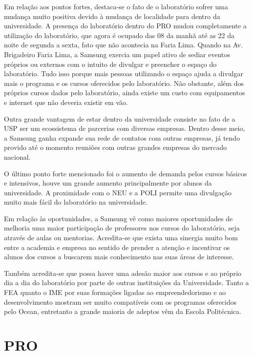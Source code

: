 Em relação aos pontos fortes, destaca-se o fato de o laboratório sofrer uma mudança muito positiva devido à mudança de localidade para dentro da universidade. A presença do laboratório dentro do PRO mudou completamente a utilização do laboratório, que agora é ocupado das 08 da manhã até as 22 da noite de segunda a sexta, fato que não acontecia na Faria Lima. Quando na Av. Brigadeiro Faria Lima, a Samsung exercia um papel ativo de sediar eventos próprios ou externos com o intuito de divulgar e preencher o espaço do laboratório. Tudo isso porque mais pessoas utilizando o espaço ajuda a divulgar mais o programa e os cursos oferecidos pelo laboratório. Não obstante, além dos próprios cursos dados pelo laboratório, ainda existe um custo com equipamentos e internet que não deveria existir em vão.

Outra grande vantagem de estar dentro da universidade consiste no fato de a USP ser um ecossistema de parcerias com diversas empresas. Dentro desse meio, a Samsung ganha expande sua rede de contatos com outras empresas, já tendo provido até o momento reuniões com outras grandes empresas do mercado nacional.

O último ponto forte mencionado foi o aumento de demanda pelos cursos básicos e intensivos, houve um grande aumento principalmente por alunos da universidade. A proximidade com o NEU e a POLI permite uma divulgação muito mais fácil do laboratório na universidade.

Em relação às oportunidades, a Samsung vê como maiores oportunidades de melhoria uma maior participação de professores nos cursos do laboratório, seja através de aulas ou mentorias. Acredita-se que exista uma sinergia muito bom entre a academia e empresa no sentido de prender a atenção e incentivar os alunos dos cursos a buscarem mais conhecimento nas suas áreas de interesse.

Também acredita-se que possa haver uma adesão maior aos cursos e ao próprio dia a dia do laboratório por parte de outras instituições da Universidade. Tanto a FEA quanto o IME por suas formações ligadas ao empreendedorismo e ao desenvolvimento mostram ser muito compatíveis com os programas oferecidos pelo Ocean, entretanto a grande maioria de adeptos vêm da Escola Politécnica.

\section{PRO}


